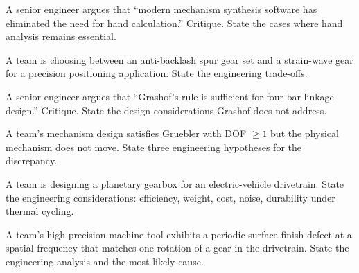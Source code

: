 \begin{exercise}
A senior engineer argues that ``modern mechanism synthesis software has eliminated the need for hand calculation.'' Critique. State the cases where hand analysis remains essential.
\end{exercise}

\begin{exercise}
A team is choosing between an anti-backlash spur gear set and a strain-wave gear for a precision positioning application. State the engineering trade-offs.
\end{exercise}

\begin{exercise}
A senior engineer argues that ``Grashof's rule is sufficient for four-bar linkage design.'' Critique. State the design considerations Grashof does not address.
\end{exercise}

\begin{exercise}
A team's mechanism design satisfies Gruebler with DOF $\geq 1$ but the physical mechanism does not move. State three engineering hypotheses for the discrepancy.
\end{exercise}

\begin{exercise}
A team is designing a planetary gearbox for an electric-vehicle drivetrain. State the engineering considerations: efficiency, weight, cost, noise, durability under thermal cycling.
\end{exercise}

\begin{exercise}
A team's high-precision machine tool exhibits a periodic surface-finish defect at a spatial frequency that matches one rotation of a gear in the drivetrain. State the engineering analysis and the most likely cause.
\end{exercise}
